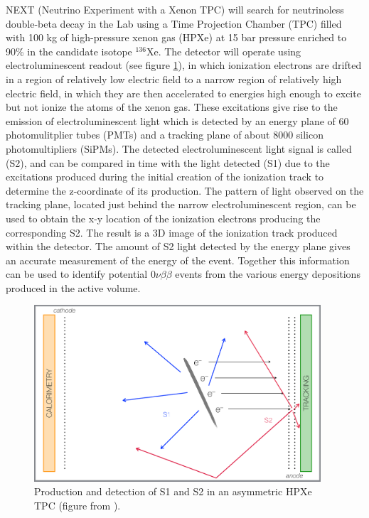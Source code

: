 \documentclass{JINST}
\begin{document}
NEXT (Neutrino Experiment with a Xenon TPC) \cite{Gomez-Cadenas:2014dxa} will search for neutrinoless double-beta decay in the Lab using a Time Projection Chamber (TPC) filled with 100 kg of 
high-pressure xenon gas (HPXe) at 15 bar pressure enriched to 90\% in the candidate isotope $^{136}$Xe.  The detector will operate using electroluminescent readout (see figure \ref{fig.SS}), in which 
ionization electrons are drifted in a region of relatively low electric field to a narrow region of relatively high electric field, in which they are then accelerated to energies high enough to excite but not 
ionize the atoms of the xenon gas.  These excitations give rise to the emission of electroluminescent light which is detected by an energy plane of 60 photomulitplier tubes (PMTs) and a tracking 
plane of about 8000 silicon photomultipliers (SiPMs).  The detected electroluminescent light signal is called (S2), and can be compared in time with the light detected (S1) due to the excitations 
produced during the initial creation of the ionization track to determine the z-coordinate of its production.  The pattern of light observed on the tracking plane, located just behind the narrow 
electroluminescent region, can be used to obtain the x-y location of the ionization electrons producing the corresponding S2.  The result is a 3D image of the ionization track produced within the 
detector.  The amount of S2 light detected by the energy plane gives an accurate measurement of the energy of the event.  Together this information can be used to identify potential 
$0\nu\beta\beta$ events from the various energy depositions produced in the active volume.

\begin{figure}[!htb]
	\centering
	\includegraphics[width= 0.95\textwidth]{fig/SoftAsymmetric_bound.pdf}
	\caption{Production and detection of S1 and S2 in an asymmetric HPXe TPC (figure from \cite{MartinAlbo_thesis}).} \label{fig.SS}
\end{figure}
\end{document}
